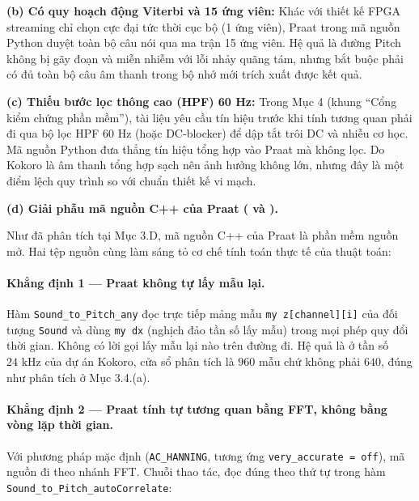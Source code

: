 \documentclass[11pt,a4paper]{article}
\begin{document}
\textbf{(b) Có quy hoạch động Viterbi và 15 ứng viên:}
Khác với thiết kế FPGA streaming chỉ chọn cực đại tức thời cục bộ (1 ứng viên), Praat trong mã nguồn Python duyệt toàn bộ câu nói qua ma trận 15 ứng viên. Hệ quả là đường Pitch không bị gãy đoạn và miễn nhiễm với lỗi nhảy quãng tám, nhưng bắt buộc phải có đủ toàn bộ câu âm thanh trong bộ nhớ mới trích xuất được kết quả.

\textbf{(c) Thiếu bước lọc thông cao (HPF) 60 Hz:}
Trong Mục 4 (khung ``Cổng kiểm chứng phần mềm''), tài liệu yêu cầu tín hiệu trước khi tính tương quan phải đi qua bộ lọc HPF 60 Hz (hoặc DC-blocker) để dập tắt trôi DC và nhiễu cơ học. Mã nguồn Python đưa thẳng tín hiệu tổng hợp vào Praat mà không lọc. Do Kokoro là âm thanh tổng hợp sạch nên ảnh hưởng không lớn, nhưng đây là một điểm lệch quy trình so với chuẩn thiết kế vi mạch.

\textbf{(d) Giải phẫu mã nguồn C++ của Praat ( và ).}

Như đã phân tích tại Mục 3.D, mã nguồn C++ của Praat là phần mềm nguồn mở. Hai tệp nguồn  cùng  làm sáng tỏ cơ chế tính toán thực tế của thuật toán:

\paragraph{Khẳng định 1 --- Praat không tự lấy mẫu lại.}
Hàm \texttt{Sound\_to\_Pitch\_any} đọc trực tiếp mảng mẫu \texttt{my z[channel][i]} của đối tượng \texttt{Sound} và dùng \texttt{my dx} (nghịch đảo tần số lấy mẫu) trong mọi phép quy đổi thời gian. Không có lời gọi lấy mẫu lại nào trên đường đi. Hệ quả là ở tần số $24\text{ kHz}$ của dự án Kokoro, cửa sổ phân tích là $960$ mẫu chứ không phải $640$, đúng như phân tích ở Mục 3.4.(a).

\paragraph{Khẳng định 2 --- Praat tính tự tương quan bằng FFT, không bằng vòng lặp thời gian.}
Với phương pháp mặc định (\texttt{AC\_HANNING}, tương ứng \texttt{very\_accurate = off}), mã nguồn đi theo nhánh FFT. Chuỗi thao tác, đọc đúng theo thứ tự trong hàm \texttt{Sound\_to\_Pitch\_autoCorrelate}:
\end{document}
